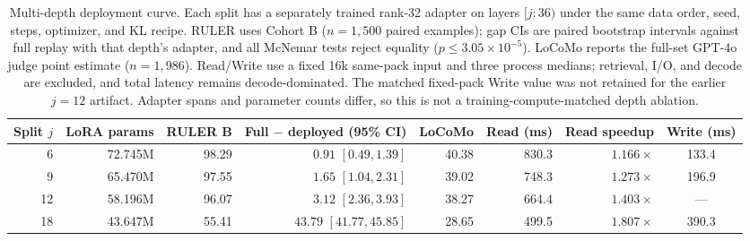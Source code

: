 \begin{table}[!tp]
\centering
\scriptsize
\setlength{\tabcolsep}{4pt}
\begin{tabular}{@{}rrrrrrrc@{}}
\toprule
\textbf{Split $j$} & \textbf{LoRA params} & \textbf{RULER B} & \textbf{Full $-$ deployed (95\% CI)} & \textbf{LoCoMo} & \textbf{Read (ms)} & \textbf{Read speedup} & \textbf{Write (ms)} \\
\midrule
6  & 72.745M & 98.29 & $0.91$ $[0.49,1.39]$ & 40.38 & 830.3 & $1.166\times$ & 133.4 \\
9  & 65.470M & 97.55 & $1.65$ $[1.04,2.31]$ & 39.02 & 748.3 & $1.273\times$ & 196.9 \\
12 & 58.196M & 96.07 & $3.12$ $[2.36,3.93]$ & 38.27 & 664.4 & $1.403\times$ & --- \\
18 & 43.647M & 55.41 & $43.79$ $[41.77,45.85]$ & 28.65 & 499.5 & $1.807\times$ & 390.3 \\
\bottomrule
\end{tabular}
\caption{Multi-depth deployment curve. Each split has a separately trained rank-32
adapter on layers $[j{:}36)$ under the same data order, seed, steps, optimizer,
and KL recipe. RULER uses Cohort B ($n{=}1{,}500$ paired examples); gap CIs are
paired bootstrap intervals against full replay with that depth's adapter, and
all McNemar tests reject equality ($p\leq3.05\times10^{-5}$). LoCoMo reports the
full-set GPT-4o judge point estimate ($n{=}1{,}986$). Read/Write use a fixed 16k
same-pack input and three process medians; retrieval, I/O, and decode are
excluded, and total latency remains decode-dominated. The matched fixed-pack
Write value was not retained for the earlier $j{=}12$ artifact. Adapter spans
and parameter counts differ, so this is not a training-compute-matched depth
ablation.}
\label{tab:distilled-depth-curve}
\end{table}

